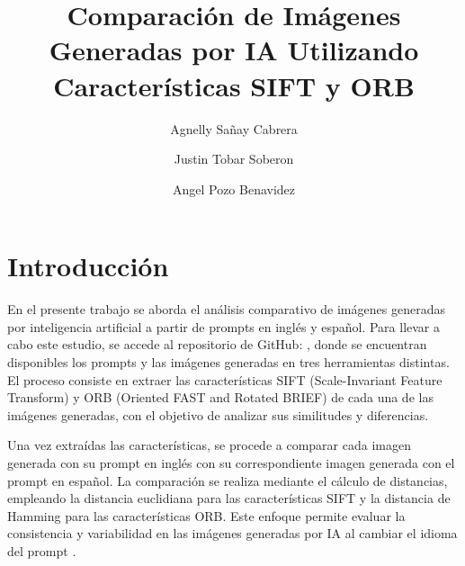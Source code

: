 \documentclass[unnumsec,webpdf,modern,large]{mam-authoring-template}
\theoremstyle{thmstyleone}%
\theoremstyle{thmstyletwo}%
\theoremstyle{thmstylethree}%
\begin{document}

\title{Comparación de Imágenes Generadas por IA Utilizando Características SIFT y ORB}

\author[1]{Agnelly Sañay Cabrera}
\author[2]{Justin Tobar Soberon}
\author[3]{Angel Pozo Benavidez}


\address[1]{, }



\maketitle

\section{Introducción}
En el presente trabajo se aborda el análisis comparativo de imágenes generadas por inteligencia artificial a partir de prompts en inglés y español. Para llevar a cabo este estudio, se accede al repositorio de GitHub: \cite{hustler013_comparacion_2025} , donde se encuentran disponibles los prompts y las imágenes generadas en tres herramientas distintas. El proceso consiste en extraer las características SIFT (Scale-Invariant Feature Transform) y ORB (Oriented FAST and Rotated BRIEF) de cada una de las imágenes generadas, con el objetivo de analizar sus similitudes y diferencias.

Una vez extraídas las características, se procede a comparar cada imagen generada con su prompt en inglés con su correspondiente imagen generada con el prompt en español. La comparación se realiza mediante el cálculo de distancias, empleando la distancia euclidiana para las características SIFT y la distancia de Hamming para las características ORB. Este enfoque permite evaluar la consistencia y variabilidad en las imágenes generadas por IA al cambiar el idioma del prompt \cite{castro2025_comparacion}.
\end{document}
